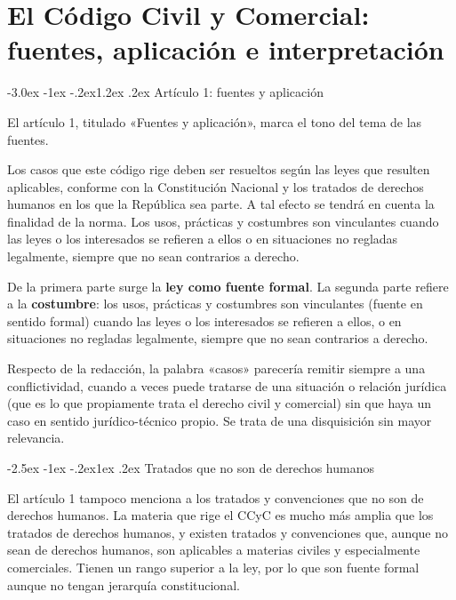 \documentclass[12pt,oneside]{book}
\makeatletter
\renewcommand\section{\@startsection{section}{1}{\z@}%
  {-3.0ex \@plus -1ex \@minus -.2ex}{1.2ex \@plus .2ex}%
  {\normalfont\large\bfseries\color{acento}}}
\renewcommand\subsection{\@startsection{subsection}{2}{\z@}%
  {-2.5ex \@plus -1ex \@minus -.2ex}{1ex \@plus .2ex}%
  {\normalfont\normalsize\bfseries}}
\makeatother
\begin{document}

\chapter[Arts. 1 y 2 del Código Civil y Comercial]{El Código Civil y Comercial: fuentes, aplicación e interpretación}
\label{ch:arts12}
\section{Artículo 1: fuentes y aplicación}

El artículo 1, titulado «Fuentes y aplicación», marca el tono del tema de las fuentes.

\begin{regla}
Los casos que este código rige deben ser resueltos según las leyes que resulten aplicables, conforme con la Constitución Nacional y los tratados de derechos humanos en los que la República sea parte. A tal efecto se tendrá en cuenta la finalidad de la norma. Los usos, prácticas y costumbres son vinculantes cuando las leyes o los interesados se refieren a ellos o en situaciones no regladas legalmente, siempre que no sean contrarios a derecho.
\end{regla}

De la primera parte surge la \textbf{ley como fuente formal}. La segunda parte refiere a la \textbf{costumbre}: los usos, prácticas y costumbres son vinculantes (fuente en sentido formal) cuando las leyes o los interesados se refieren a ellos, o en situaciones no regladas legalmente, siempre que no sean contrarios a derecho.

Respecto de la redacción, la palabra «casos» parecería remitir siempre a una conflictividad, cuando a veces puede tratarse de una situación o relación jurídica (que es lo que propiamente trata el derecho civil y comercial) sin que haya un caso en sentido jurídico-técnico propio. Se trata de una disquisición sin mayor relevancia.

\subsection{Tratados que no son de derechos humanos}

El artículo 1 tampoco menciona a los tratados y convenciones que no son de derechos humanos. La materia que rige el CCyC es mucho más amplia que los tratados de derechos humanos, y existen tratados y convenciones que, aunque no sean de derechos humanos, son aplicables a materias civiles y especialmente comerciales. Tienen un rango superior a la ley, por lo que son fuente formal aunque no tengan jerarquía constitucional.
\end{document}
